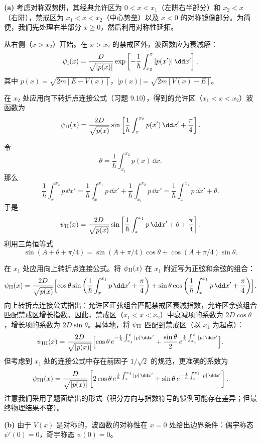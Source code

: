 \begin{solution}
\textbf{(a)} 考虑对称双势阱，其经典允许区为 $0<x<x_1$（左阱右半部分）和 $x_2<x$（右阱），禁戒区为 $x_1<x<x_2$（中心势垒）以及 $x<0$ 的对称镜像部分。为简便，我们先处理右半部分 $x\ge0$，然后利用对称性延拓。

从右侧（$x>x_2$）开始。在 $x>x_2$ 的禁戒区外，波函数应为衰减解：
\[
\psi_{\rm I}(x)=\frac{D}{\sqrt{|p(x)|}}\exp\left[-\frac{1}{\hbar}\int_{x_2}^{x}|p(x')|\,\dd x'\right],
\]
其中 $p(x)=\sqrt{2m[E-V(x)]}$，$|p(x)|=\sqrt{2m[V(x)-E]}$。

在 $x_2$ 处应用向下转折点连接公式（习题 9.10），得到的允许区（$x_1<x<x_2$）波函数为
\[
\psi_{\rm II}(x)=\frac{2D}{\sqrt{p(x)}}\sin\left[\frac{1}{\hbar}\int_x^{x_2}p(x')\,\dd x'+\frac{\pi}{4}\right].
\]

令
\[
\theta=\frac{1}{\hbar}\int_{x_1}^{x_2}p(x)\,\dd x.
\]
那么
\[
\frac{1}{\hbar}\int_x^{x_2}p\,\dd x'
=\frac{1}{\hbar}\int_x^{x_1}p\,\dd x'+\frac{1}{\hbar}\int_{x_1}^{x_2}p\,\dd x'
=\frac{1}{\hbar}\int_x^{x_1}p\,\dd x'+\theta.
\]
于是
\[
\psi_{\rm II}(x)=\frac{2D}{\sqrt{p(x)}}
\sin\left[\frac{1}{\hbar}\int_x^{x_1}p\,\dd x'+\theta+\frac{\pi}{4}\right].
\]
利用三角恒等式
\[
\sin(A+\theta+\pi/4)=\sin(A+\pi/4)\cos\theta+\cos(A+\pi/4)\sin\theta.
\]

在 $x_1$ 处应用向上转折点连接公式。将 $\psi_{\rm II}(x)$ 在 $x_1$ 附近写为正弦和余弦的组合：
\[
\psi_{\rm II}(x)=\frac{2D}{\sqrt{p(x)}}
\Bigl[\cos\theta\sin\left(\frac{1}{\hbar}\int_x^{x_1}p\,\dd x'+\frac{\pi}{4}\right)
+\sin\theta\cos\left(\frac{1}{\hbar}\int_x^{x_1}p\,\dd x'+\frac{\pi}{4}\right)\Bigr].
\]
向上转折点连接公式指出：允许区正弦组合匹配禁戒区衰减指数，允许区余弦组合匹配禁戒区增长指数。因此，禁戒区（$x_1<x<x_2$）中衰减项的系数为 $2D\cos\theta$，增长项的系数为 $2D\sin\theta$。具体地，将 $\psi_{\rm II}$ 匹配到禁戒区（以 $x_1$ 为起点）：
\[
\psi_{\rm III}(x)=\frac{2D}{\sqrt{|p(x)|}}
\Bigl[\cos\theta\,e^{-\frac{1}{\hbar}\int_{x_1}^{x}|p|\,\dd x'}
+\frac{\sin\theta}{2}\,e^{\frac{1}{\hbar}\int_{x_1}^{x}|p|\,\dd x'}\Bigr].
\]
但考虑到 $x_1$ 处的连接公式中存在前因子 $1/\sqrt2$ 的规范，更准确的系数为
\[
\psi_{\rm III}(x)=\frac{D}{\sqrt{|p(x)|}}
\left[2\cos\theta\,e^{\frac{1}{\hbar}\int_{x}^{x_1}|p|\,\dd x'}
+\sin\theta\,e^{-\frac{1}{\hbar}\int_{x}^{x_1}|p|\,\dd x'}\right].
\]
注意我们采用了题面给出的形式（积分方向与指数符号的惯例可能存在差异；但最终物理结果不变）。

\textbf{(b)} 由于 $V(x)$ 是对称的，波函数的对称性在 $x=0$ 处给出边界条件：偶宇称态 $\psi'(0)=0$，奇宇称态 $\psi(0)=0$。


\end{solution}
